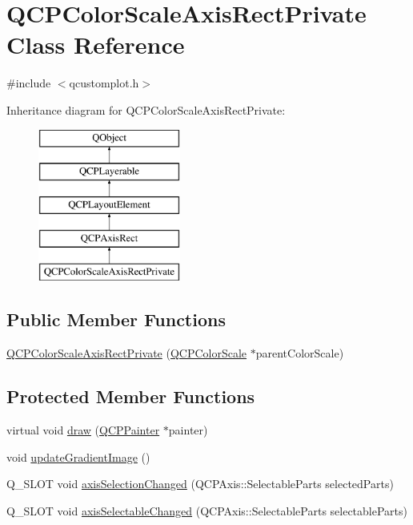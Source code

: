 \hypertarget{class_q_c_p_color_scale_axis_rect_private}{}\section{Q\+C\+P\+Color\+Scale\+Axis\+Rect\+Private Class Reference}
\label{class_q_c_p_color_scale_axis_rect_private}


{\ttfamily \#include $<$qcustomplot.\+h$>$}

Inheritance diagram for Q\+C\+P\+Color\+Scale\+Axis\+Rect\+Private\+:\begin{figure}[H]
\begin{center}
\leavevmode
\includegraphics[height=5.000000cm]{class_q_c_p_color_scale_axis_rect_private}
\end{center}
\end{figure}
\subsection*{Public Member Functions}
\begin{DoxyCompactItemize}
\item 
\hyperlink{class_q_c_p_color_scale_axis_rect_private_ad3b242f75dd2b33581364a4e668a80db}{Q\+C\+P\+Color\+Scale\+Axis\+Rect\+Private} (\hyperlink{class_q_c_p_color_scale}{Q\+C\+P\+Color\+Scale} $\ast$parent\+Color\+Scale)
\end{DoxyCompactItemize}
\subsection*{Protected Member Functions}
\begin{DoxyCompactItemize}
\item 
virtual void \hyperlink{class_q_c_p_color_scale_axis_rect_private_adb67bfe9057a9dd9a85f548c274e6d98}{draw} (\hyperlink{class_q_c_p_painter}{Q\+C\+P\+Painter} $\ast$painter)
\item 
void \hyperlink{class_q_c_p_color_scale_axis_rect_private_a73754cab312aeaddea1bfcc67cc079ac}{update\+Gradient\+Image} ()
\item 
Q\+\_\+\+S\+L\+O\+T void \hyperlink{class_q_c_p_color_scale_axis_rect_private_a6112ad4291ac1695d37659cb049d598d}{axis\+Selection\+Changed} (Q\+C\+P\+Axis\+::\+Selectable\+Parts selected\+Parts)
\item 
Q\+\_\+\+S\+L\+O\+T void \hyperlink{class_q_c_p_color_scale_axis_rect_private_a66d2baed86966bb03a6d7c32dc7d59f7}{axis\+Selectable\+Changed} (Q\+C\+P\+Axis\+::\+Selectable\+Parts selectable\+Parts)
\end{DoxyCompactItemize}
